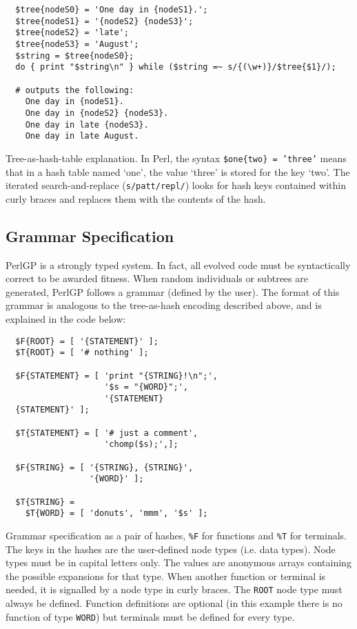 \documentclass[a4paper]{article}
\begin{document}
\begin{verbatim}
  $tree{nodeS0} = 'One day in {nodeS1}.';
  $tree{nodeS1} = '{nodeS2} {nodeS3}';
  $tree{nodeS2} = 'late';
  $tree{nodeS3} = 'August';
  $string = $tree{nodeS0};
  do { print "$string\n" } while ($string =~ s/{(\w+)}/$tree{$1}/);

  # outputs the following:
    One day in {nodeS1}.
    One day in {nodeS2} {nodeS3}.
    One day in late {nodeS3}.
    One day in late August.
\end{verbatim}
\begin{center}\small
Tree-as-hash-table explanation.  In Perl,
the syntax \texttt{\$one\{two\} = 'three'}
means that in a hash table named `one', the value `three' is stored
for the key `two'.  The iterated search-and-replace
(\texttt{s/patt/repl/})
looks for hash keys contained within curly
braces and replaces them with the contents of the hash. 
\end{center}


\subsection{\label{sect:grammar}Grammar Specification}

PerlGP is a strongly typed system.  In fact, all evolved code must be
syntactically correct to be awarded fitness.  When random individuals
or subtrees are generated, PerlGP follows a grammar (defined by the
user).  The format of this grammar is analogous to the tree-as-hash
encoding described above, and is explained in the code below:


\begin{verbatim}
  $F{ROOT} = [ '{STATEMENT}' ];
  $T{ROOT} = [ '# nothing' ];

  $F{STATEMENT} = [ 'print "{STRING}!\n";',
                    '$s = "{WORD}";',
                    '{STATEMENT}
  {STATEMENT}' ];

  $T{STATEMENT} = [ '# just a comment',
                    'chomp($s);',];

  $F{STRING} = [ '{STRING}, {STRING}',
                 '{WORD}' ];

  $T{STRING} =
    $T{WORD} = [ 'donuts', 'mmm', '$s' ];
\end{verbatim}

\begin{center} \small
Grammar specification as a pair of hashes,
\texttt{\%F} for functions and \texttt{\%T} for terminals.  The keys
in the hashes are the user-defined node types (i.e. data types).  Node
types must be in capital letters only.  The values are anonymous
arrays containing the possible expansions for that type.  When another
function or terminal is needed, it is signalled by a node type in
curly braces.  The \texttt{ROOT} node type must always be defined.
Function definitions are optional (in this example there is no
function of type \texttt{WORD}) but terminals must be defined for every type.
\end{center}
\end{document}
